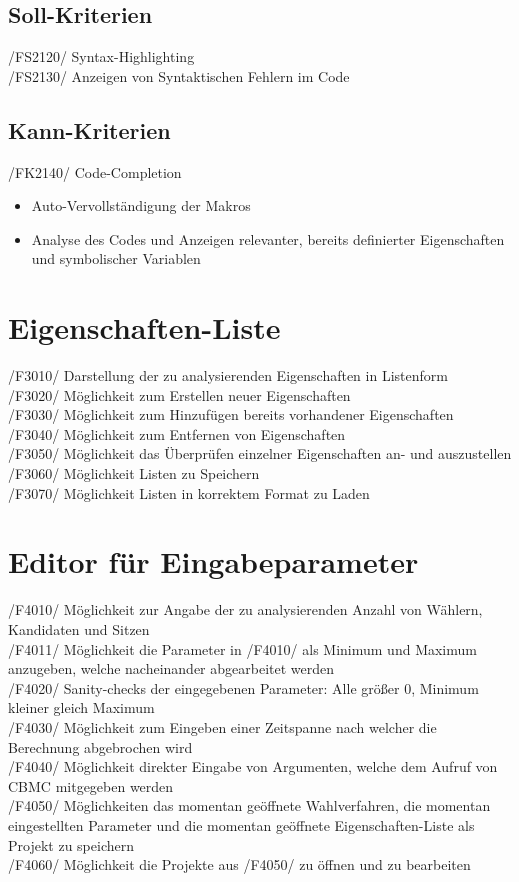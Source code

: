 \documentclass[a4paper]{scrreprt}
\begin{document}
\subsection{Soll-Kriterien}
/FS2120/ Syntax-Highlighting \\
/FS2130/ Anzeigen von Syntaktischen Fehlern im Code \\

\subsection{Kann-Kriterien}
/FK2140/ Code-Completion
\begin{itemize}
\item Auto-Vervollständigung der Makros
\item Analyse des Codes und Anzeigen relevanter, bereits definierter Eigenschaften und symbolischer Variablen
\end{itemize}

\section{Eigenschaften-Liste}
/F3010/ Darstellung der zu analysierenden Eigenschaften in Listenform \\
/F3020/ Möglichkeit zum Erstellen neuer Eigenschaften \\
/F3030/ Möglichkeit zum Hinzufügen bereits vorhandener Eigenschaften \\
/F3040/ Möglichkeit zum Entfernen von Eigenschaften \\
/F3050/ Möglichkeit das Überprüfen einzelner Eigenschaften an- und auszustellen \\
/F3060/ Möglichkeit Listen zu Speichern \\
/F3070/ Möglichkeit Listen in korrektem Format zu Laden \\

\section{Editor für Eingabeparameter}
/F4010/ Möglichkeit zur Angabe der zu analysierenden Anzahl von Wählern, Kandidaten und Sitzen \\
/F4011/ Möglichkeit die Parameter in /F4010/ als Minimum und Maximum anzugeben, welche nacheinander abgearbeitet werden \\
/F4020/ Sanity-checks der eingegebenen Parameter: Alle größer 0, Minimum kleiner gleich Maximum \\
/F4030/ Möglichkeit zum Eingeben einer Zeitspanne nach welcher die Berechnung abgebrochen wird \\
/F4040/ Möglichkeit direkter Eingabe von Argumenten, welche dem Aufruf von CBMC mitgegeben werden \\
/F4050/ Möglichkeiten das momentan geöffnete Wahlverfahren, die momentan eingestellten Parameter und die momentan geöffnete Eigenschaften-Liste als Projekt zu speichern \\
/F4060/ Möglichkeit die Projekte aus /F4050/ zu öffnen und zu bearbeiten
\end{document}
